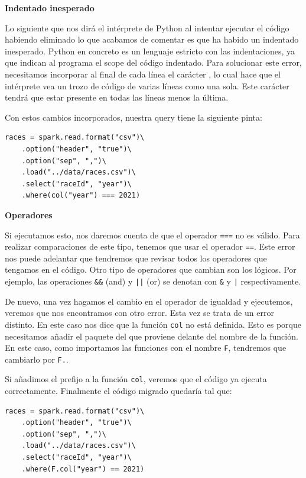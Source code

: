 \documentclass[12pt,twoside,titlepage]{report}
\begin{document}
\textbf{Indentado inesperado}

Lo siguiente que nos dirá el intérprete de Python al intentar ejecutar el código habiendo eliminado lo que acabamos de comentar es que ha habido un indentado inesperado. Python en concreto es un lenguaje estricto con las indentaciones, ya que indican al programa el scope del código indentado. Para solucionar este error, necesitamos incorporar al final de cada línea el carácter \texttt{}, lo cual hace que el intérprete vea un trozo de código de varias líneas como una sola. Este carácter tendrá que estar presente en todas las líneas menos la última.

Con estos cambios incorporados, nuestra query tiene la siguiente pinta:

\begin{lstlisting}
races = spark.read.format("csv")\
	.option("header", "true")\
	.option("sep", ",")\
	.load("../data/races.csv")\
	.select("raceId", "year")\
	.where(col("year") === 2021)
\end{lstlisting}

\textbf{Operadores}

Si ejecutamos esto, nos daremos cuenta de que el operador \texttt{===} no es válido. Para realizar comparaciones de este tipo, tenemos que usar el operador \texttt{==}. Este error nos puede adelantar que tendremos que revisar todos los operadores que tengamos en el código. Otro tipo de operadores que cambian son los lógicos. Por ejemplo, las operaciones \texttt{\&\&} (and) y \texttt{||} (or) se denotan con \texttt{\&} y \texttt{|} respectivamente.

De nuevo, una vez hagamos el cambio en el operador de igualdad y ejecutemos, veremos que nos encontramos con otro error. Esta vez se trata de un error distinto. En este caso nos dice que la función \texttt{col} no está definida. Esto es porque necesitamos añadir el paquete del que proviene delante del nombre de la función. En este caso, como importamos las funciones con el nombre \texttt{F}, tendremos que cambiarlo por \texttt{F.}.

Si añadimos el prefijo a la función \texttt{col}, veremos que el código ya ejecuta correctamente. Finalmente el código migrado quedaría tal que:

\begin{lstlisting}
races = spark.read.format("csv")\
	.option("header", "true")\
	.option("sep", ",")\
	.load("../data/races.csv")\
	.select("raceId", "year")\
	.where(F.col("year") == 2021)
\end{lstlisting}
\end{document}
